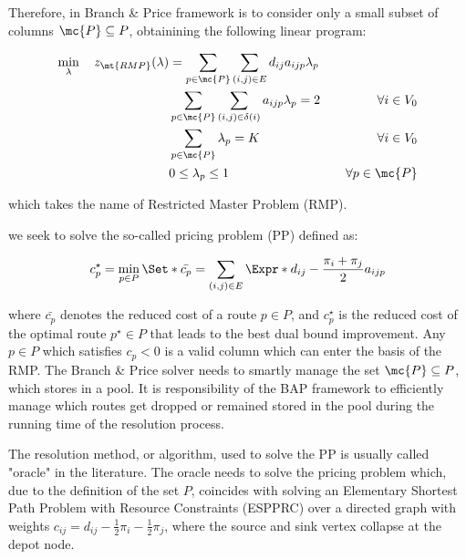 \medskip

Therefore, in Branch \& Price framework is to consider only a small subset of columns $\mc{P} \subseteq P$, obtainining the following linear program:

\begin{align}
	\min_{\lambda} \quad z_\mt{RMP}(\lambda) & = \sum_{p \in \mc{P}} \sum_{(i, j) \in E} d_{ij} a_{ijp} \lambda_p \label{eq:rmp-obj-func}                                                                                                                              \\
	                                         & \sum_{p \in \mc{P}} \sum_{(i, j) \in \delta(i)} a_{ijp} \lambda_p = 2                      & \quad \forall i \in V_0                                              \label{eq:rmp-customers-visited-by-exactly-one-route} \\
	                                         & \sum_{p \in \mc{P}} \lambda_{p} = K                                                        & \quad \forall i \in V_0                                              \label{eq:rmp-K-routes}                               \\
	                                         & 0 \le \lambda_p \le 1                                                                      & \quad \forall p \in \mc{P} \label{eq:rmp-lambda-mip-var-bounds}
\end{align}

which takes the name of Restricted Master Problem (RMP).

we seek to solve the so-called pricing problem (PP) defined as:

\begin{equation}
	{c^\star_p} = \min_{p \in P} \Set*{ \bar{c_p} = \sum_{(i, j) \in E} \Expr*{d_{ij} - \frac{\pi_i + \pi_j}{2}} a_{ijp}  }
\end{equation}

where $\bar{c_p}$ denotes the reduced cost of a route $p \in P$, and $c^\star_p$ is the reduced cost of the optimal route $p^\star \in P$ that leads to the best dual bound improvement.
Any $p \in P$ which satisfies $c_p < 0$ is a valid column which can enter the basis of the RMP.
The Branch \& Price solver needs to smartly manage the set $\mc{P} \subseteq P$, which stores in a pool.
It is responsibility of the BAP framework to efficiently manage which routes get dropped or remained stored in the pool during the running time of the resolution process.

The resolution method, or algorithm, used to solve the PP is usually called "oracle" in the literature.
The oracle needs to solve the pricing problem which, due to the definition of the set $P$, coincides with solving an Elementary Shortest Path Problem with Resource Constraints (ESPPRC) over a directed graph with weights $c_{ij} = d_{ij} - \frac{1}{2} \pi_i - \frac{1}{2} \pi_j$, where the source and sink vertex collapse at the depot node.

